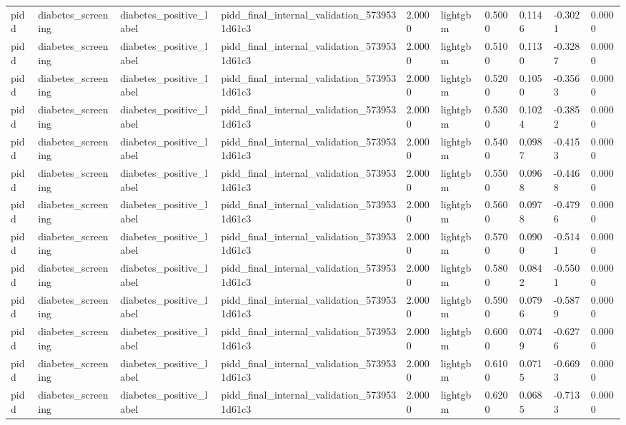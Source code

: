 \begin{tabular}{llllllllll}
pidd & diabetes\_screening & diabetes\_positive\_label & pidd\_final\_internal\_validation\_5739531d61c3 & 2.0000 & lightgbm & 0.5000 & 0.1146 & -0.3021 & 0.0000 \\
pidd & diabetes\_screening & diabetes\_positive\_label & pidd\_final\_internal\_validation\_5739531d61c3 & 2.0000 & lightgbm & 0.5100 & 0.1130 & -0.3287 & 0.0000 \\
pidd & diabetes\_screening & diabetes\_positive\_label & pidd\_final\_internal\_validation\_5739531d61c3 & 2.0000 & lightgbm & 0.5200 & 0.1050 & -0.3563 & 0.0000 \\
pidd & diabetes\_screening & diabetes\_positive\_label & pidd\_final\_internal\_validation\_5739531d61c3 & 2.0000 & lightgbm & 0.5300 & 0.1024 & -0.3852 & 0.0000 \\
pidd & diabetes\_screening & diabetes\_positive\_label & pidd\_final\_internal\_validation\_5739531d61c3 & 2.0000 & lightgbm & 0.5400 & 0.0987 & -0.4153 & 0.0000 \\
pidd & diabetes\_screening & diabetes\_positive\_label & pidd\_final\_internal\_validation\_5739531d61c3 & 2.0000 & lightgbm & 0.5500 & 0.0968 & -0.4468 & 0.0000 \\
pidd & diabetes\_screening & diabetes\_positive\_label & pidd\_final\_internal\_validation\_5739531d61c3 & 2.0000 & lightgbm & 0.5600 & 0.0978 & -0.4796 & 0.0000 \\
pidd & diabetes\_screening & diabetes\_positive\_label & pidd\_final\_internal\_validation\_5739531d61c3 & 2.0000 & lightgbm & 0.5700 & 0.0900 & -0.5141 & 0.0000 \\
pidd & diabetes\_screening & diabetes\_positive\_label & pidd\_final\_internal\_validation\_5739531d61c3 & 2.0000 & lightgbm & 0.5800 & 0.0842 & -0.5501 & 0.0000 \\
pidd & diabetes\_screening & diabetes\_positive\_label & pidd\_final\_internal\_validation\_5739531d61c3 & 2.0000 & lightgbm & 0.5900 & 0.0796 & -0.5879 & 0.0000 \\
pidd & diabetes\_screening & diabetes\_positive\_label & pidd\_final\_internal\_validation\_5739531d61c3 & 2.0000 & lightgbm & 0.6000 & 0.0749 & -0.6276 & 0.0000 \\
pidd & diabetes\_screening & diabetes\_positive\_label & pidd\_final\_internal\_validation\_5739531d61c3 & 2.0000 & lightgbm & 0.6100 & 0.0715 & -0.6693 & 0.0000 \\
pidd & diabetes\_screening & diabetes\_positive\_label & pidd\_final\_internal\_validation\_5739531d61c3 & 2.0000 & lightgbm & 0.6200 & 0.0685 & -0.7133 & 0.0000 \\

\end{tabular}
